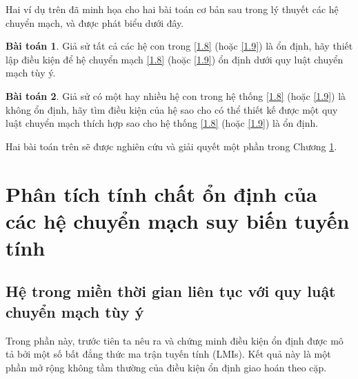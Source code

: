 \documentclass[12pt,a4paper]{report}
\theoremstyle{definition}
\theoremstyle{definition}
\newtheorem{bt}{Bài toán}
\numberwithin{dl}{chapter}
\numberwithin{vd}{chapter}
\numberwithin{corollary}{chapter}
\numberwithin{lemma}{chapter}
\numberwithin{md}{chapter}
\numberwithin{dn}{chapter}
\numberwithin{cy}{chapter}
\numberwithin{nx}{chapter}
\begin{document}
Hai ví dụ trên đã minh họa cho hai bài toán cơ bản sau trong lý thuyết các hệ chuyển mạch, và được phát biểu dưới đây.

\begin{bt}\label{bài toán 1}
Giả  sử tất cả các hệ con trong \eqref{1.8} (hoặc \eqref{1.9}) là ổn định, hãy thiết lập điều kiện để hệ chuyển mạch \eqref{1.8} (hoặc \eqref{1.9}) ổn định dưới quy luật chuyển mạch tùy ý.
\end{bt}

\begin{bt}\label{bài toán 2}
Giả  sử có một hay nhiều hệ con trong hệ thống \eqref{1.8} (hoặc \eqref{1.9}) là không ổn định, hãy tìm điều kiện của hệ sao cho có thể thiết kế được một quy luật chuyển mạch thích hợp sao cho hệ thống \eqref{1.8} (hoặc \eqref{1.9}) là ổn định.
\end{bt}

Hai bài toán trên sẽ được nghiên cứu và giải quyết một phần trong Chương \ref{Chapter 2}.

\chapter{Phân tích tính chất ổn định của các hệ chuyển mạch suy biến tuyến tính }\label{Chapter 2}
\section{Hệ trong miền thời gian liên tục với quy luật chuyển mạch tùy ý}
Trong phần này, trước tiên ta nêu ra và chứng minh điều kiện ổn định được mô tả bởi một số bất đẳng thức ma trận tuyến tính (LMIs). Kết quả này là một phần mở rộng không tầm thường của điều kiện ổn định giao hoán theo cặp.
\end{document}
